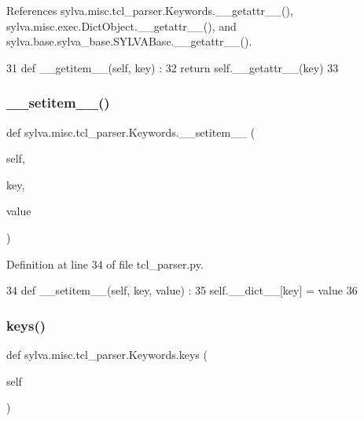 References sylva.\+misc.\+tcl\+\_\+parser.\+Keywords.\+\_\+\+\_\+getattr\+\_\+\+\_\+(), sylva.\+misc.\+exec.\+Dict\+Object.\+\_\+\+\_\+getattr\+\_\+\+\_\+(), and sylva.\+base.\+sylva\+\_\+base.\+S\+Y\+L\+V\+A\+Base.\+\_\+\+\_\+getattr\+\_\+\+\_\+().


\begin{DoxyCode}
31     \textcolor{keyword}{def }\_\_getitem\_\_(self, key) :
32       \textcolor{keywordflow}{return} self.\_\_getattr\_\_(key)
33 
\end{DoxyCode}
\mbox{\label{classsylva_1_1misc_1_1tcl__parser_1_1_keywords_a3472d59fe7173f29ba51f1153a8d9710}} 
\subsubsection{\texorpdfstring{\+\_\+\+\_\+setitem\+\_\+\+\_\+()}{\_\_setitem\_\_()}}
{\footnotesize\ttfamily def sylva.\+misc.\+tcl\+\_\+parser.\+Keywords.\+\_\+\+\_\+setitem\+\_\+\+\_\+ (\begin{DoxyParamCaption}\item[{}]{self,  }\item[{}]{key,  }\item[{}]{value }\end{DoxyParamCaption})}



Definition at line 34 of file tcl\+\_\+parser.\+py.


\begin{DoxyCode}
34     \textcolor{keyword}{def }\_\_setitem\_\_(self, key, value) :
35       self.\_\_dict\_\_[key] = value
36 
\end{DoxyCode}
\mbox{\label{classsylva_1_1misc_1_1tcl__parser_1_1_keywords_aab14f0aa36691de260b7c63be5ad6ee9}} 
\subsubsection{\texorpdfstring{keys()}{keys()}}
{\footnotesize\ttfamily def sylva.\+misc.\+tcl\+\_\+parser.\+Keywords.\+keys (\begin{DoxyParamCaption}\item[{}]{self }\end{DoxyParamCaption})}



